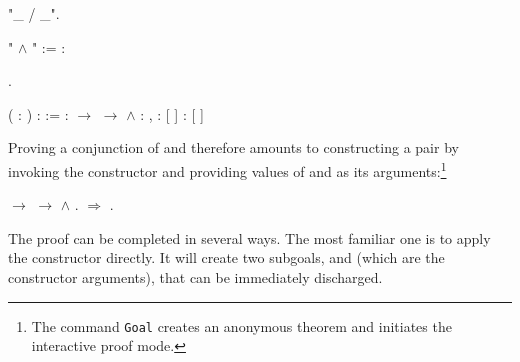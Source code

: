 \begin{coqdoccode}
\coqdocemptyline
\coqdocnoindent
{} "\_ / \_".\coqdoceol
\coqdocemptyline
\end{coqdoccode}
" \ensuremath{\land} " :=     :  \begin{coqdoccode}
\coqdocemptyline
\coqdocnoindent
{} .\coqdoceol
\coqdocemptyline
\end{coqdoccode}




\coqdoceol
\coqdocemptyline
\coqdocnoindent
{}  (  : ) :  :=   :  \ensuremath{\rightarrow}  \ensuremath{\rightarrow}  \ensuremath{\land} \coqdoceol
\coqdocnoindent
\coqdoceol
\coqdocnoindent
{} :  ,   \coqdoceol
\coqdocnoindent
{} :    [ ]\coqdoceol
\coqdocnoindent
{} :    [  \coqdocvar{\_} \coqdocvar{\_}]

\coqdocemptyline


Proving a conjunction of  and  therefore amounts to constructing
a pair by invoking the constructor  and providing values of 
and  as its arguments:\footnote{The command
\texttt{Goal} creates an anonymous theorem and initiates
the interactive proof mode.}


\begin{coqdoccode}
\coqdocemptyline
\coqdocnoindent
{}  \ensuremath{\rightarrow}  \ensuremath{\rightarrow}  \ensuremath{\land} .\coqdoceol
\coqdocnoindent
{}\ensuremath{\Rightarrow}  .\coqdoceol
\coqdocemptyline
\end{coqdoccode}


The proof can be completed in several ways. The most familiar one is
to apply the constructor  directly. It will create two subgoals,
 and  (which are the constructor arguments), that can be
immediately discharged.


